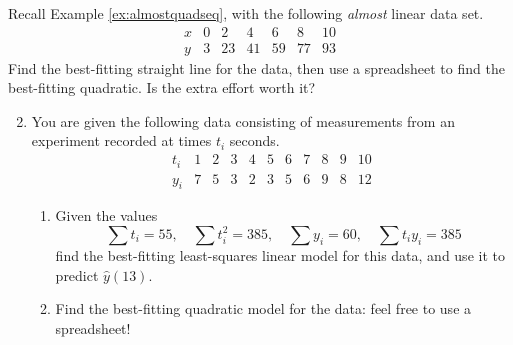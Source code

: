 \begin{exercises}{}{}
\exstart Recall Example \ref{ex:almostquadseq}, with the following \emph{almost} linear data set.
\[\begin{array}{c|cccccc}
x&0&2&4&6&8&10\\\hline
y&3&23&41&59&77&93
\end{array}\]
 Find the best-fitting straight line for the data, then use a spreadsheet to find the best-fitting quadratic. Is the extra effort worth it? 

\begin{enumerate}\setcounter{enumi}{1}
  \item You are given the following data consisting of measurements from an experiment recorded at times $t_i$ seconds.
  \[\begin{array}{c|cccccccccc}
  t_i&1&2&3&4&5&6&7&8&9&10\\\hline
  y_i&7&5&3&2&3&5&6&9&8&12
  \end{array}\]
  \begin{enumerate}
    \item Given the values
  	\[\sum t_i=55,\quad \sum t_i^2=385,\quad \sum y_i=60,\quad \sum t_iy_i=385\]
  	find the best-fitting least-squares linear model for this data, and use it to predict $\hat y(13)$.
    
    \item Find the best-fitting quadratic model for the data: feel free to use a spreadsheet!
    

\end{enumerate}
\end{enumerate}
\end{exercises}

